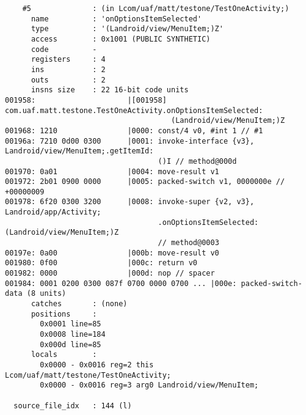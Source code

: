 \begin{lstlisting}
    #5              : (in Lcom/uaf/matt/testone/TestOneActivity;)
      name          : 'onOptionsItemSelected'
      type          : '(Landroid/view/MenuItem;)Z'
      access        : 0x1001 (PUBLIC SYNTHETIC)
      code          -
      registers     : 4
      ins           : 2
      outs          : 2
      insns size    : 22 16-bit code units
001958:                     |[001958] com.uaf.matt.testone.TestOneActivity.onOptionsItemSelected:
                                      (Landroid/view/MenuItem;)Z
001968: 1210                |0000: const/4 v0, #int 1 // #1
00196a: 7210 0d00 0300      |0001: invoke-interface {v3}, Landroid/view/MenuItem;.getItemId:
                                   ()I // method@000d
001970: 0a01                |0004: move-result v1
001972: 2b01 0900 0000      |0005: packed-switch v1, 0000000e // +00000009
001978: 6f20 0300 3200      |0008: invoke-super {v2, v3}, Landroid/app/Activity;
                                   .onOptionsItemSelected:(Landroid/view/MenuItem;)Z
                                   // method@0003
00197e: 0a00                |000b: move-result v0
001980: 0f00                |000c: return v0
001982: 0000                |000d: nop // spacer
001984: 0001 0200 0300 087f 0700 0000 0700 ... |000e: packed-switch-data (8 units)
      catches       : (none)
      positions     :
        0x0001 line=85
        0x0008 line=184
        0x000d line=85
      locals        :
        0x0000 - 0x0016 reg=2 this Lcom/uaf/matt/testone/TestOneActivity;
        0x0000 - 0x0016 reg=3 arg0 Landroid/view/MenuItem;

  source_file_idx   : 144 (l)
\end{lstlisting}